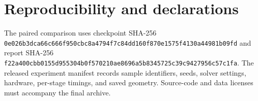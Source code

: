 \documentclass[preprint,12pt]{elsarticle}
\begin{document}
\section*{Reproducibility and declarations}
The paired comparison uses checkpoint SHA-256
\texttt{0e026b3dca66c666f950cbc8a4794f7c84dd160f870e1575f4130a44981b09fd}
and report SHA-256
\texttt{f22a400cbb0155d955304b0f570210ae8696a5b8345725c39c9427956c57c1fa}.
The released experiment manifest records sample identifiers, seeds, solver
settings, hardware, per-stage timings, and saved geometry. Source-code and data
licenses must accompany the final archive.


\end{document}

